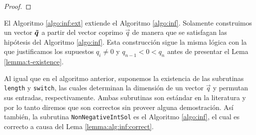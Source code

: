 \begin{proof}
\end{proof}

El Algoritmo \ref{algo:inf:ext} extiende el Algoritmo \ref{algo:inf}. Solamente construimos un
vector $\boldsymbol{\tilde{q}}$ a partir del vector coprimo $\vec{q}$ de manera que se satisfagan las
hipótesis del Algoritmo \ref{algo:inf}. Esta construcción sigue la misma lógica con la que
justificamos los supuestos $q_i \neq 0$ y $q_{n-1} < 0 < q_n$ antes de presentar el Lema
\ref{lemma:t-existence}.

Al igual que en el algoritmo anterior, suponemos la existencia de las subrutinas \texttt{length} y
\texttt{switch}, las cuales determinan la dimensión de un vector $\vec{q}$ y permutan sus entradas,
respectivamente. Ambas subrutinas son estándar en la literatura y por lo tanto diremos que son
correctos sin proveer alguna demostración. Así también, la subrutina \texttt{NonNegativeIntSol} es
el Algoritmo \ref{algo:inf}, el cual es correcto a causa del Lema \ref{lemma:alg:inf:correct}.

